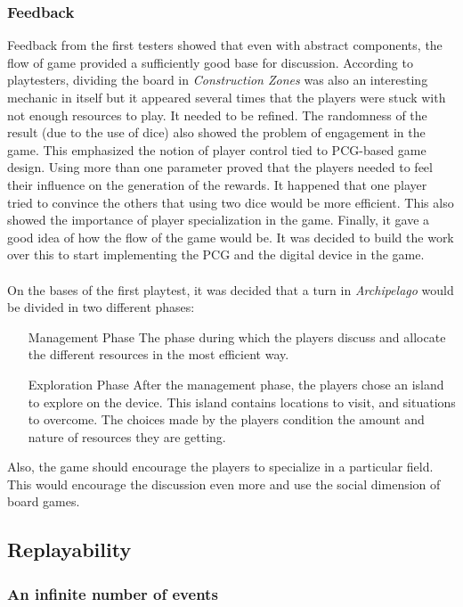 \subsubsection{Feedback}
Feedback from the first testers showed that even with abstract components, the flow of game provided a sufficiently good base for discussion. According to playtesters, dividing the board in \textit{Construction Zones} was also an interesting mechanic in itself but it appeared several times that the players were stuck with not enough resources to play. It needed to be refined. The randomness of the result (due to the use of dice) also showed the problem of engagement in the game. This emphasized the notion of player control tied to PCG-based game design. Using more than one parameter proved that the players needed to feel their influence on the generation of the rewards. It happened that one player tried to convince the others that using two dice would be more efficient. This also showed the importance of player specialization in the game. 
Finally, it gave a good idea of how the flow of the game would be. It was decided to build the work over this to start implementing the PCG and the digital device in the game.\\\\

On the bases of the first playtest, it was decided that a turn in \textit{Archipelago} would be divided in two different phases:
\begin{itemize}
\item[Management Phase] The phase during which the players discuss and allocate the different resources in the most efficient way.
\item[Exploration Phase] After the management phase, the players chose an island to explore on the device. This island contains locations to visit, and situations to overcome. The choices made by the players condition the amount and nature of resources they are getting.
\end{itemize}
Also, the game should encourage the players to specialize in a particular field. This would encourage the discussion even more and use the social dimension of board games.

\subsection{Replayability}
\subsubsection{An infinite number of events}
